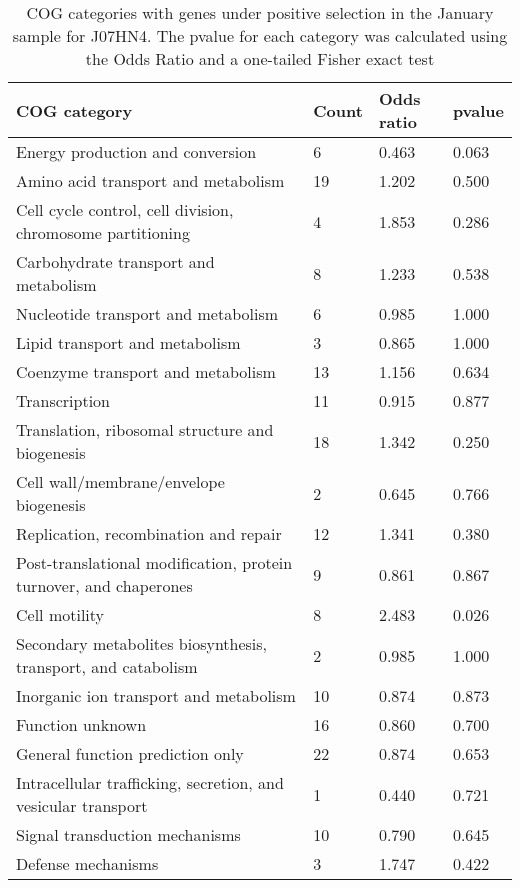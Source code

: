 \begin{table}[]
\footnotesize 
	\tabcolsep=0.11cm 
\caption{COG categories with genes under positive selection in the January sample for J07HN4. The pvalue for each category was calculated using the Odds Ratio and a one-tailed Fisher exact test \\} 
\begin{tabularx}{\textwidth}{L{6cm}R{2cm}R{2cm}R{2cm}} 
\hline 
\textbf{COG category} & \textbf{Count} & \textbf{Odds ratio} & \textbf{pvalue} \\ 
\hline 
Energy production and conversion & 6 & 0.463 & 0.063 \\ 
Amino acid transport and metabolism & 19 & 1.202 & 0.500 \\ 
Cell cycle control, cell division, chromosome partitioning & 4 & 1.853 & 0.286 \\ 
Carbohydrate transport and metabolism & 8 & 1.233 & 0.538 \\ 
Nucleotide transport and metabolism & 6 & 0.985 & 1.000 \\ 
Lipid transport and metabolism & 3 & 0.865 & 1.000 \\ 
Coenzyme transport and metabolism & 13 & 1.156 & 0.634 \\ 
Transcription & 11 & 0.915 & 0.877 \\ 
Translation, ribosomal structure and biogenesis & 18 & 1.342 & 0.250 \\ 
Cell wall/membrane/envelope biogenesis & 2 & 0.645 & 0.766 \\ 
Replication, recombination and repair & 12 & 1.341 & 0.380 \\ 
Post-translational modification, protein turnover, and chaperones & 9 & 0.861 & 0.867 \\ 
Cell motility & 8 & 2.483 & 0.026 \\ 
Secondary metabolites biosynthesis, transport, and catabolism & 2 & 0.985 & 1.000 \\ 
Inorganic ion transport and metabolism & 10 & 0.874 & 0.873 \\ 
Function unknown & 16 & 0.860 & 0.700 \\ 
General function prediction only & 22 & 0.874 & 0.653 \\ 
Intracellular trafficking, secretion, and vesicular transport & 1 & 0.440 & 0.721 \\ 
Signal transduction mechanisms & 10 & 0.790 & 0.645 \\ 
Defense mechanisms & 3 & 1.747 & 0.422 \\ 
\end{tabularx} 
\label{January_COG_Selection_J07HN4} 
 \end{table} 

